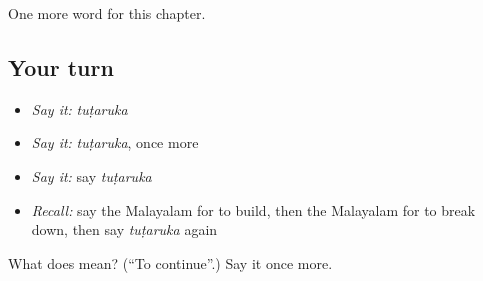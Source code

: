 \begin{grammarlens}[title={What you've built}]
One more word for this chapter.
\end{grammarlens}

\subsection*{Your turn}
\begin{itemize}
\raggedright
  \item \emph{Say it:} \emph{tuṭaruka}
  \item \emph{Say it:} \emph{tuṭaruka}, once more
  \item \emph{Say it:} say \emph{tuṭaruka}
  \item \emph{Recall:} say the Malayalam for to build, then the Malayalam for to break down, then say \emph{tuṭaruka} again
\end{itemize}

\begin{tcolorbox}[breakable,colback=teal!4,colframe=teal!35!black,title={Before you move on}]
What does  mean? (\textquotedblleft{}To continue\textquotedblright{}.) Say it once more.
\end{tcolorbox}
